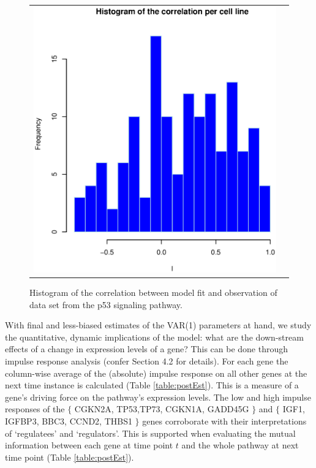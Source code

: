 \documentclass[a4paper]{article}
\begin{document}
\begin{figure}[h!]
\centering
\begin{tabular}{cc}
\includegraphics[scale=0.5]{corFitObs.eps}\\
\end{tabular}
\caption{Histogram of the correlation between model fit and observation of data set from the p53 signaling pathway.}
\label{fig:corFitObs}
\end{figure}


With final and less-biased estimates of the VAR(1) parameters at hand, we study the quantitative, dynamic implications of the model: what are the down-stream effects of a change in expression levels of a gene? This can be done through impulse response analysis (confer Section 4.2 for details). For each gene the column-wise average of the (absolute) impulse response on all other genes at the next time instance is calculated (Table \ref{table:postEst}). This is a measure of a gene's driving force on the pathway's expression levels. The low and high impulse responses of the $\{$ CGKN2A, TP53,TP73, CGKN1A, GADD45G $\}$ and $\{$ IGF1, IGFBP3, BBC3, CCND2, THBS1 $\}$ genes corroborate with their interpretations of `regulatees' and `regulators'. This is supported when evaluating the mutual information between each gene at time point $t$ and the whole pathway at next time point (Table \ref{table:postEst}). 
\end{document}
